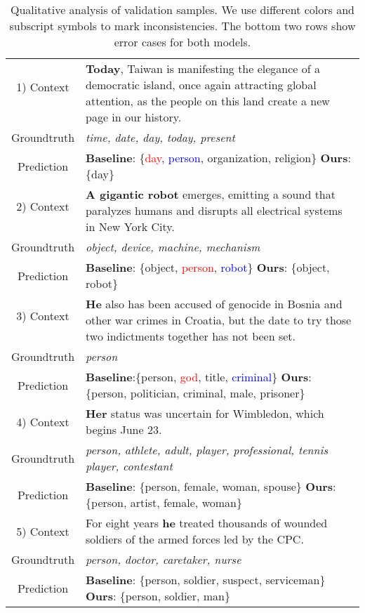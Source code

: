 \documentclass[11pt,a4paper]{article}
\begin{document}
\begin{table*}[]
    \centering
    \small
    \begin{tabular}{c|l}
    \toprule
            1) Context & \multirow{2}{13cm}{\textbf{Today}, Taiwan is manifesting the elegance of a democratic island, once again attracting global attention, as the people on this land create a new page in our history.} \\
        & \\
        Groundtruth & \textit{time, date, day, today, present} \\
        Prediction & \textbf{Baseline}: \{\textcolor{red}{day}, \textcolor{blue}{person}, organization, religion\} \textbf{Ours}: \{day\} \\ \midrule
        
        2) Context & \multirow{2}{13cm}{\textbf{A gigantic robot} emerges, emitting a sound that paralyzes humans and disrupts all electrical systems in New York City.} \\
        & \\
        Groundtruth & \textit{object, device, machine, mechanism} \\
        Prediction & \textbf{Baseline}: \{object, \textcolor{red}{person}, \textcolor{blue}{robot}\} \textbf{Ours}: \{object, robot\}\\ \midrule
        
        3) Context & \multirow{2}{13cm}{\textbf{He} also has been accused of genocide in Bosnia and other war crimes in Croatia, but the date to try those two indictments together has not been set.}\\
        & \\
        Groundtruth & \textit{person} \\ 
        Prediction & \textbf{Baseline}:\{person, \textcolor{red}{god}, title, \textcolor{blue}{criminal}\} \textbf{Ours}: \{person, politician, criminal, male, prisoner\}\\ \midrule
        

        4) Context & \multirow{1}{13cm}{\textbf{Her} status was uncertain for Wimbledon, which begins June 23.} \\
        Groundtruth & \textit{person, athlete, adult, player, professional, tennis player, contestant} \\
        Prediction & \textbf{Baseline}: \{person, female, woman, spouse\} \textbf{Ours}: \{person, artist, female, woman\} \\ \midrule 
        
        5) Context & For eight years \textbf{he} treated thousands of wounded soldiers of the armed forces led by the CPC. \\
        Groundtruth & \textit{person, doctor, caretaker, nurse} \\
        Prediction & \textbf{Baseline}: \{person, soldier, suspect, serviceman\} \textbf{Ours}: \{person, soldier, man\}
        \\ \bottomrule
    \end{tabular}
    \caption{Qualitative analysis of validation samples.  We use different colors and subscript symbols to mark inconsistencies. The bottom two rows show error cases for both models.}
    \label{tab:human_analysis}
\end{table*}
\end{document}
